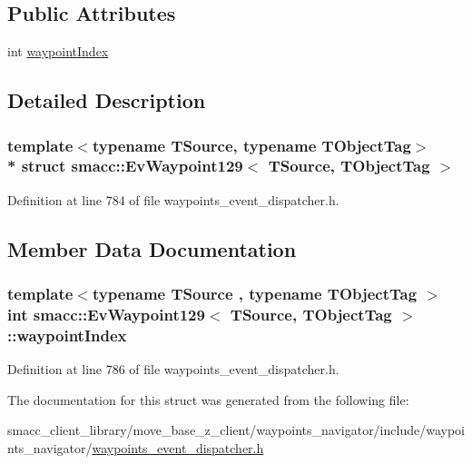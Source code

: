 \subsection*{Public Attributes}
\begin{DoxyCompactItemize}
\item 
int \hyperlink{structsmacc_1_1EvWaypoint129_af7e42aea11fcfa73b719becbba494ecd}{waypoint\+Index}
\end{DoxyCompactItemize}


\subsection{Detailed Description}
\subsubsection*{template$<$typename T\+Source, typename T\+Object\+Tag$>$\\*
struct smacc\+::\+Ev\+Waypoint129$<$ T\+Source, T\+Object\+Tag $>$}



Definition at line 784 of file waypoints\+\_\+event\+\_\+dispatcher.\+h.



\subsection{Member Data Documentation}
\subsubsection[{\texorpdfstring{waypoint\+Index}{waypointIndex}}]{\setlength{\rightskip}{0pt plus 5cm}template$<$typename T\+Source , typename T\+Object\+Tag $>$ int {\bf smacc\+::\+Ev\+Waypoint129}$<$ T\+Source, T\+Object\+Tag $>$\+::waypoint\+Index}\hypertarget{structsmacc_1_1EvWaypoint129_af7e42aea11fcfa73b719becbba494ecd}{}\label{structsmacc_1_1EvWaypoint129_af7e42aea11fcfa73b719becbba494ecd}


Definition at line 786 of file waypoints\+\_\+event\+\_\+dispatcher.\+h.



The documentation for this struct was generated from the following file\+:\begin{DoxyCompactItemize}
\item 
smacc\+\_\+client\+\_\+library/move\+\_\+base\+\_\+z\+\_\+client/waypoints\+\_\+navigator/include/waypoints\+\_\+navigator/\hyperlink{waypoints__event__dispatcher_8h}{waypoints\+\_\+event\+\_\+dispatcher.\+h}\end{DoxyCompactItemize}
